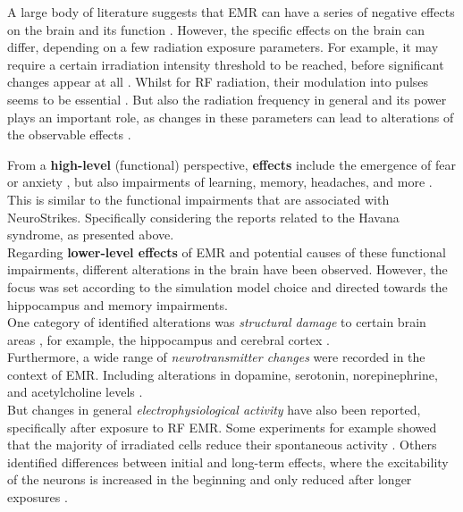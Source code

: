         A large body of literature suggests that EMR can have a series of negative effects on the brain and its function \cite{Hu.2021} \cite{Lai.1994} \cite{Zhi.2017}. However, the specific effects on the brain can differ, depending on a few radiation exposure parameters. For example, it may require a certain irradiation intensity threshold to be reached, before significant changes appear at all \cite{DAndrea.1999}. Whilst for RF radiation, their modulation into pulses seems to be essential \cite{Huber.2005}. But also the radiation frequency in general and its power plays an important role, as changes in these parameters can lead to alterations of the observable effects \cite{Hu.2021}.
        
        From a \textbf{high-level} (functional) perspective, \textbf{effects} include the emergence of fear or anxiety \cite{Kereya.2018}, but also impairments of learning, memory, headaches, and more \cite{calvente2016does} \cite{Lin.2021} \cite{Tan.2017}. This is similar to the functional impairments that are associated with NeuroStrikes. Specifically considering the reports related to the Havana syndrome, as presented above.\\
        Regarding \textbf{lower-level effects} of EMR and potential causes of these functional impairments, different alterations in the brain have been observed. However, the focus was set according to the simulation model choice and directed towards the hippocampus and memory impairments.\\ %
        One category of identified alterations was \textit{structural damage} to certain brain areas \cite{Hu.2021} \cite{Tan.2017}, for example, the hippocampus and cerebral cortex \cite{Lin.2021}.\\
        Furthermore, a wide range of \textit{neurotransmitter changes} were recorded in the context of EMR. Including alterations in dopamine, serotonin, norepinephrine, and acetylcholine levels \cite{Hu.2021}.\\
        But changes in general \textit{electrophysiological activity} have also been reported, specifically after exposure to RF EMR. Some experiments for example showed that the majority of irradiated cells reduce their spontaneous activity \cite{seaman1978slow} \cite{wachtel1975effects}. Others identified differences between initial and long-term effects, where the excitability of the neurons is increased in the beginning and only reduced after longer exposures \cite{dumansky1974biologic}.

